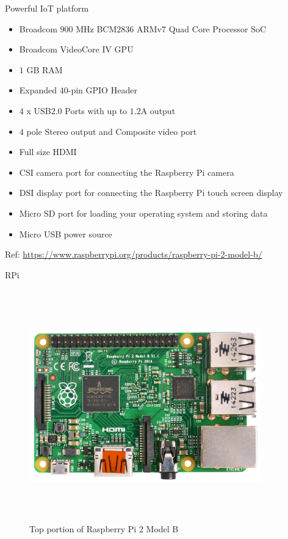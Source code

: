 \begin{frame}{Powerful IoT platform}
	\begin{itemize}
		\item Broadcom $900$ MHz BCM$2836$ ARMv$7$ Quad Core Processor SoC 
		\item Broadcom VideoCore IV GPU
		\item $1$ GB RAM
		\item Expanded $40$-pin GPIO Header
		\item $4$ x USB$2.0$ Ports with up to $1.2$A output
		\item $4$ pole Stereo output and Composite video port
		\item Full size HDMI
		\item CSI camera port for connecting the Raspberry Pi camera
		\item DSI display port for connecting the Raspberry Pi touch screen display
		\item Micro SD port for loading your operating system and storing data
		\item Micro USB power source
	\end{itemize}
	Ref: \url{https://www.raspberrypi.org/products/raspberry-pi-2-model-b/}
\end{frame}

\begin{frame}{RPi}
	\begin{figure}
		\centering
		\includegraphics[width=10cm,height=10cm,keepaspectratio]{RPi2}
		\caption{Top portion of Raspberry Pi 2 Model B}
	\end{figure}
\end{frame}

